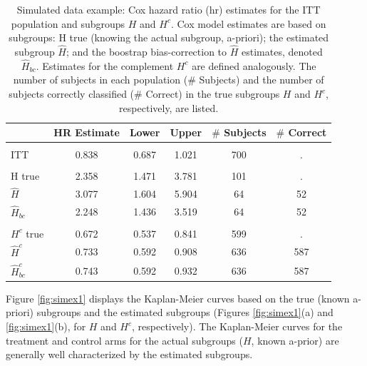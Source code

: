 \documentclass[smallextended]{svjour3}
\begin{document}
\begin{table}[!h]

\caption{\label{tab:simex1_tab}\label{tab:simex1} Simulated data example: Cox hazard ratio (hr) estimates for the ITT population and subgroups $H$ and $H^{c}$.
Cox model estimates are based on subgroups: H true (knowing the actual subgroup, a-priori); the estimated subgroup $\hat{H}$; and 
the boostrap bias-correction to $\hat{H}$ estimates, denoted $\hat{H}_{bc}$.  Estimates for the complement $H^{c}$ are defined analogously.
The number of subjects in each population ($\#$ Subjects) and the number of subjects correctly classified ($\#$ Correct) in the true subgroups $H$ and $H^{c}$, respectively, are listed.}
\centering
\fontsize{9}{11}\selectfont
\begin{tabular}[t]{lccccc}
\toprule
  & HR Estimate & Lower & Upper & $\#$ Subjects & $\#$ Correct\\
\midrule
\addlinespace[0.3em]
\multicolumn{6}{l}{\textbf{ITT}}\\
\hspace{1em}ITT & 0.838 & 0.687 & 1.021 & 700 & .\\
\addlinespace[0.3em]
\multicolumn{6}{l}{\textbf{H subgroup estimates}}\\
\hspace{1em}H true & 2.358 & 1.471 & 3.781 & 101 & .\\
\hspace{1em}$\hat{H}$ & 3.077 & 1.604 & 5.904 & 64 & 52\\
\hspace{1em}$\hat{H}_{bc}$ & 2.248 & 1.436 & 3.519 & 64 & 52\\
\addlinespace[0.3em]
\multicolumn{6}{l}{\textbf{H-complement subgroup estimates}}\\
\hspace{1em}$H^{c}$ true & 0.672 & 0.537 & 0.841 & 599 & .\\
\hspace{1em}$\hat{H}^{c}$ & 0.733 & 0.592 & 0.908 & 636 & 587\\
\hspace{1em}$\hat{H}^{c}_{bc}$ & 0.743 & 0.592 & 0.932 & 636 & 587\\
\bottomrule
\end{tabular}
\end{table}




Figure \ref{fig:simex1} displays the Kaplan-Meier curves based on the true (known a-priori) subgroups and the estimated subgroups (Figures \ref{fig:simex1}(a) and \ref{fig:simex1}(b), for $H$ and $H^{c}$, respectively).  The Kaplan-Meier curves for the treatment and control arms for the actual subgroups ($H$, known a-prior) are generally well characterized by the estimated subgroups.  
\end{document}
